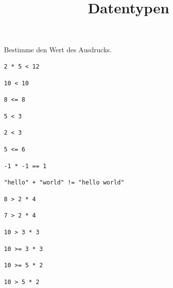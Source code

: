 \documentclass[DIV = 11]{scrartcl}
\title{Datentypen}
\begin{document}
\begin{aufgabe}
Bestimme den Wert des Ausdrucks.
\begin{teilaufgaben}

\teilaufgabe
\begin{verbatim}
2 * 5 < 12
\end{verbatim}

\teilaufgabe
\begin{verbatim}
10 < 10
\end{verbatim}

\teilaufgabe
\begin{verbatim}
8 <= 8
\end{verbatim}

\teilaufgabe
\begin{verbatim}
5 < 3
\end{verbatim}

\teilaufgabe
\begin{verbatim}
2 < 3
\end{verbatim}

\teilaufgabe
\begin{verbatim}
5 <= 6
\end{verbatim}

\teilaufgabe
\begin{verbatim}
-1 * -1 == 1
\end{verbatim}

\teilaufgabe
\begin{verbatim}
"hello" + "world" != "hello world"
\end{verbatim}

\teilaufgabe
\begin{verbatim}
8 > 2 * 4
\end{verbatim}

\teilaufgabe
\begin{verbatim}
7 > 2 * 4
\end{verbatim}

\teilaufgabe
\begin{verbatim}
10 > 3 * 3
\end{verbatim}

\teilaufgabe
\begin{verbatim}
10 >= 3 * 3
\end{verbatim}

\teilaufgabe
\begin{verbatim}
10 >= 5 * 2
\end{verbatim}

\teilaufgabe
\begin{verbatim}
10 > 5 * 2
\end{verbatim}
\end{teilaufgaben}
\end{aufgabe}
\end{document}

